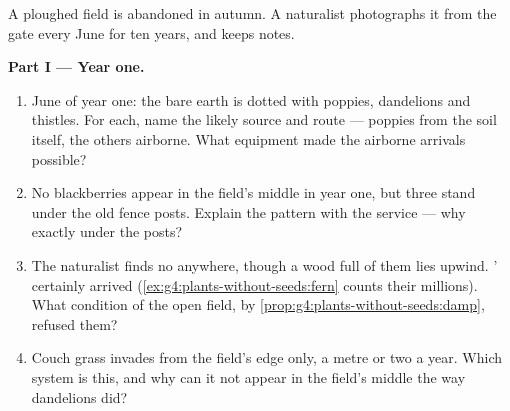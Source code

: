 \begin{problem}\label{pb:g6:how-plants-spread:1}
A ploughed field is abandoned in autumn. A naturalist
photographs it from the gate every June for ten years, and
keeps notes.

\medskip\noindent\textbf{Part I --- Year one.}
\begin{enumerate}
  \item June of year one: the bare earth is dotted with
        poppies, dandelions and thistles. For each, name
        the likely source and route --- poppies from the
        soil itself, the others airborne. What equipment
        made the airborne arrivals possible?
  \item No blackberries appear in the field's middle in
        year one, but three  stand under the old
        fence posts. Explain the pattern with the
         service --- why exactly under the
        posts?
  \item The naturalist finds no  anywhere, though a
        wood full of them lies upwind. ' 
        certainly arrived (\cref{ex:g4:plants-without-seeds:fern}
        counts their millions). What condition of the open
        field, by \cref{prop:g4:plants-without-seeds:damp},
        refused them?
  \item Couch grass invades from the field's edge only, a
        metre or two a year. Which  system is
        this, and why can it not appear in the field's
        middle the way dandelions did?
\end{enumerate}


\end{problem}
